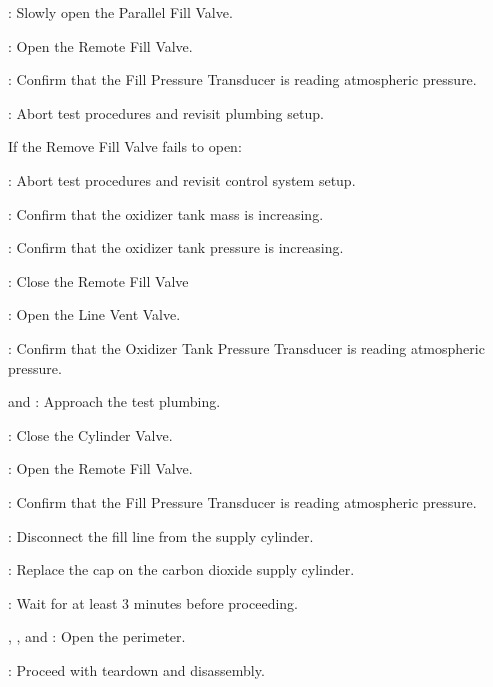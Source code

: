 \begin{checklist}
\begin{checklist}[label=$\bullet$]
\begin{checklist}
            \item \primary{}: Slowly open the Parallel Fill Valve.
            \item \primary{}: Open the Remote Fill Valve.
            \item \daq{}: Confirm that the Fill Pressure Transducer is reading atmospheric pressure.
            \item \ops{}: Abort test procedures and revisit plumbing setup.
        \end{checklist}
        \item If the Remove Fill Valve fails to open:
        \begin{checklist}
            \item \ops{}: Abort test procedures and revisit control system setup.
        \end{checklist}
    \end{checklist}
    \item \daq: Confirm that the oxidizer tank mass is increasing.
    \item \daq: Confirm that the oxidizer tank pressure is increasing.
    \item \primary: Close the Remote Fill Valve
    \item \primary{}: Open the Line Vent Valve.
    \item \daq{}: Confirm that the Oxidizer Tank Pressure Transducer is reading atmospheric pressure.
    \item \primary{} and \secondary: Approach the test plumbing.
    \item \primary{}: Close the Cylinder Valve.
    \item \primary{}: Open the Remote Fill Valve.
    \item \daq{}: Confirm that the Fill Pressure Transducer is reading atmospheric pressure.
    \item \primary{}: Disconnect the fill line from the supply cylinder.
    \item \primary{}: Replace the cap on the carbon dioxide supply cylinder.
    \item \ops{}: Wait for at least 3 minutes before proceeding.
    \item \peri{}, \perii{}, and \periii{}: Open the perimeter.
    \item \ops{}: Proceed with teardown and disassembly. 
\end{checklist}
\setcounter{checklistnum}{0}
\newpage

